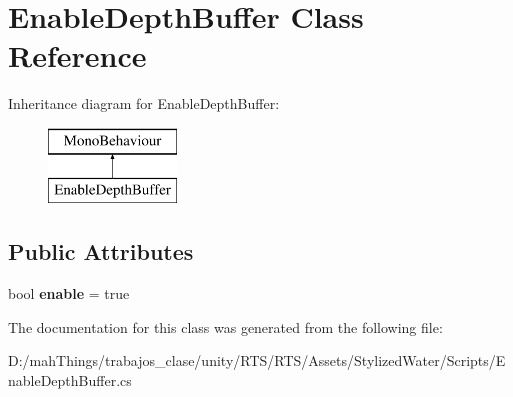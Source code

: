 \hypertarget{class_enable_depth_buffer}{}\section{Enable\+Depth\+Buffer Class Reference}
\label{class_enable_depth_buffer}
Inheritance diagram for Enable\+Depth\+Buffer\+:\begin{figure}[H]
\begin{center}
\leavevmode
\includegraphics[height=2.000000cm]{class_enable_depth_buffer}
\end{center}
\end{figure}
\subsection*{Public Attributes}
\begin{DoxyCompactItemize}
\item 
\mbox{\label{class_enable_depth_buffer_a3b0ebd3ecec499c77ecbd536a0719130}} 
bool {\bfseries enable} = true
\end{DoxyCompactItemize}


The documentation for this class was generated from the following file\+:\begin{DoxyCompactItemize}
\item 
D\+:/mah\+Things/trabajos\+\_\+clase/unity/\+R\+T\+S/\+R\+T\+S/\+Assets/\+Stylized\+Water/\+Scripts/Enable\+Depth\+Buffer.\+cs\end{DoxyCompactItemize}
